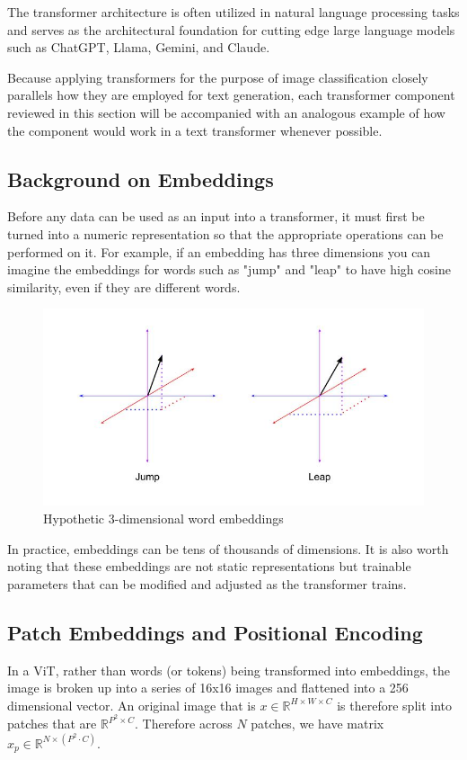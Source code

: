 \documentclass [MAS] {uclathes}
\begin{document}
The transformer architecture is often utilized in natural language processing tasks and serves as the 
architectural foundation for cutting edge large language models such as ChatGPT, Llama, Gemini, and Claude. 

Because applying transformers for the purpose of image classification closely parallels how they are employed for text
generation, each transformer component reviewed in this section will be accompanied with an analogous example of how the
component would work in a text transformer whenever possible.

\subsection{Background on Embeddings}
Before any data can be used as an input into a transformer, it must first be turned into a numeric representation so 
that the appropriate operations can be performed on it. For example, if an embedding has three dimensions you can 
imagine the embeddings for words such as "jump" and "leap" to have high cosine similarity, even if they are different 
words.

\begin{figure} [H]
    \centering
    \includegraphics[width=1\linewidth]{figures/Cosine Similarity Example.jpg}
    \caption{Hypothetic 3-dimensional word embeddings}
    \label{fig:hypothetical word embeddings}
\end{figure}

In practice, embeddings can be tens of thousands of dimensions. It is also worth noting that these embeddings are not 
static representations but trainable parameters that can be modified and adjusted as the transformer trains. 

\subsection{Patch Embeddings and Positional Encoding}
In a ViT, rather than words (or tokens) being transformed into embeddings, the image is broken up into a series of 16x16
images and flattened into a 256 dimensional vector. An original image that is \(x \in \mathbb{R}^{H \times W \times C}\)
is therefore split into patches that are  \(\mathbb{R}^{P^2 \times C}\). Therefore across \(N\) patches, we have matrix
\(x_p \in \mathbb{R}^{N \times (P^2 \cdot C)}\).
\end{document}
